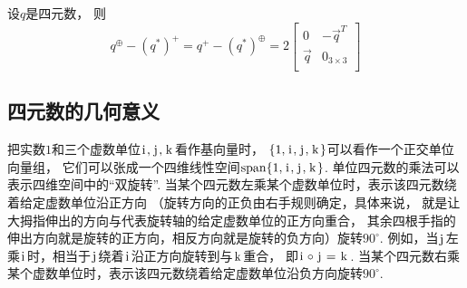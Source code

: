 \begin{example}
设\(q\)是四元数，
则\begin{equation*}
	q^\oplus - (q^*)^+
	= q^+ - (q^*)^\oplus
	= 2 \begin{bmatrix}
		0 & - \vec{q}^T \\
		\vec{q} & 0_{3\times3} \\
	\end{bmatrix}
\end{equation*}
\end{example}

\subsection{四元数的几何意义}
把实数\(1\)和三个虚数单位\(\iu,\ju,\ku\)看作基向量时，
\(\{1,\iu,\ju,\ku\}\)可以看作一个正交单位向量组，
它们可以张成一个四维线性空间\(\Span\{1,\iu,\ju,\ku\}\).
单位四元数的乘法可以表示四维空间中的“双旋转”.
当某个四元数左乘某个虚数单位时，表示该四元数绕着给定虚数单位沿正方向
（旋转方向的正负由右手规则确定，具体来说，
就是让大拇指伸出的方向与代表旋转轴的给定虚数单位的正方向重合，
其余四根手指的伸出方向就是旋转的正方向，相反方向就是旋转的负方向）旋转\(90^\circ\).
例如，当\(\ju\)左乘\(\iu\)时，相当于\(\ju\)绕着\(\iu\)沿正方向旋转到与\(\ku\)重合，
即\(\iu \circ \ju = \ku\).
当某个四元数右乘某个虚数单位时，表示该四元数绕着给定虚数单位沿负方向旋转\(90^\circ\).

